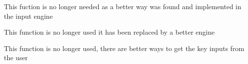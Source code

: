 
\begin{DoxyRefList}
\item[\label{deprecated__deprecated000001}%
\hypertarget{deprecated__deprecated000001}{}%
Member \hyperlink{class_s_f_m_l___facade_a09e484b954d3b6a1a1590860f80e022b}{S\-F\-M\-L\-\_\-\-Facade\-:\-:get\-Event} ()]This fuction is no longer needed as a better way was found and implemented in the input engine  
\item[\label{deprecated__deprecated000003}%
\hypertarget{deprecated__deprecated000003}{}%
Member \hyperlink{class_window_a1f00d7696a8ef63e34313e5a5a1224b7}{Window\-:\-:get\-Event} ()]This function is no longer used it has been replaced by a better engine  
\item[\label{deprecated__deprecated000002}%
\hypertarget{deprecated__deprecated000002}{}%
Member \hyperlink{class_window_a4a680ada9e0fea7c45c8c84614cb5699}{Window\-:\-:Window} (\hyperlink{class_s_f_m_l___facade}{S\-F\-M\-L\-\_\-\-Facade} window)]This function is no longer used, there are better ways to get the key inputs from the user 
\end{DoxyRefList}